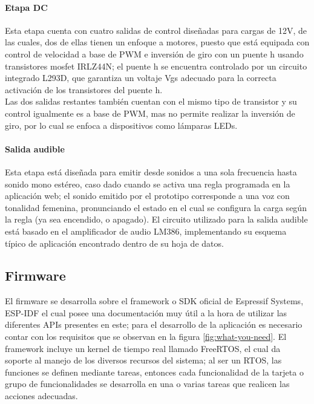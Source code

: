 	\paragraph{Etapa DC}
		Esta etapa cuenta con cuatro salidas de control diseñadas para cargas de 12V, de las cuales, dos de ellas tienen un enfoque a motores, puesto que está equipada con control de velocidad a base de PWM e inversión de giro con un puente h usando transistores mosfet IRLZ44N; el puente h se encuentra controlado por un circuito integrado L293D, que garantiza un voltaje Vgs adecuado para la correcta activación de los transistores del puente h.\\
		
		Las dos salidas restantes también cuentan con el mismo tipo de transistor y su control igualmente es a base de PWM, mas no permite realizar la inversión de giro, por lo cual se enfoca a dispositivos como lámparas LEDs.\\
	
	\paragraph{Salida audible}
		Esta etapa está diseñada para emitir desde sonidos a una sola frecuencia hasta sonido mono estéreo, caso dado cuando se activa una regla programada en la aplicación web; el sonido emitido por el prototipo corresponde a una voz con tonalidad femenina, pronunciando el estado en el cual se configura la carga según la regla (ya sea encendido, o apagado). El circuito utilizado para la salida audible está basado en el amplificador de audio LM386, implementando su esquema típico de aplicación encontrado dentro de su hoja de datos.\cite{LM386}\\	
				
\subsection{Firmware}

El firmware se desarrolla sobre el framework o SDK oficial de Espressif Systems, ESP-IDF el cual posee una documentación \cite{ES} muy útil a la hora de utilizar las diferentes APIs presentes en este; para el desarrollo de la aplicación es necesario contar con los requisitos que se observan en la figura \ref{fig:what-you-need}. El framework incluye un kernel de tiempo real llamado FreeRTOS, el cual da soporte al manejo de los diversos recursos del sistema; al ser un RTOS, las funciones se definen mediante tareas, entonces cada funcionalidad de la tarjeta o grupo de funcionalidades se desarrolla en una o varias tareas que realicen las acciones adecuadas.\\


